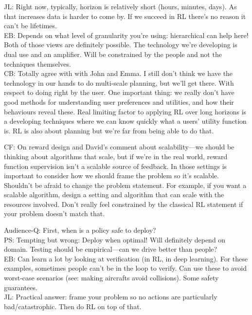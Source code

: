 JL: Right now, typically, horizon is relatively short (hours, minutes, days). As that increases data is harder to come by. If we succeed in RL there's no reason it can't be lifetimes. \\

EB: Depends on what level of granularity you're using: hierarchical can help here! Both of those views are definitely possible. The technology we're developing is dual use and an amplifier. Will be constrained by the people and not the techniques themselves. \\

CB: Totally agree with with John and Emma. I still don't think we have the technology in our hands to do multi-scale planning, but we'll get there. With respect to doing right by the user. One important thing: we really don't have good methods for understanding user preferences and utilities, and how their behaviours reveal these. Real limiting factor to applying RL over long horizons is a developing techniques where we can know quickly what a users' utility function is. RL is also about planning but we're far from being able to do that.

CF: On reward design and David's comment about scalability---we should be thinking about algorithms that scale, but if we're in the real world, reward function supervision isn't a scalable source of feedback. In those settings is important to consider how we should frame the problem so it's scalable. Shouldn't be afraid to change the problem statement. For example, if you want a scalable algorithm, design a setting and algorithm that can scale with the resources involved. Don't really feel constrained by the classical RL statement if your problem doesn't match that.

\spacerule

Audience-Q: First, when is a policy safe to deploy? \\

PS: Tempting but wrong: Deploy when optimal! Will definitely depend on domain. Testing should be empirical---can we drive better than people? \\

EB: Can learn a lot by looking at verification (in RL, in deep learning). For these examples, sometimes people can't be in the loop to verify. Can use these to avoid worst-case scenarios (see: making aircrafts avoid collisions). Some safety guarantees. \\

JL: Practical answer: frame your problem so no actions are particularly bad/catastrophic. Then do RL on top of that.




